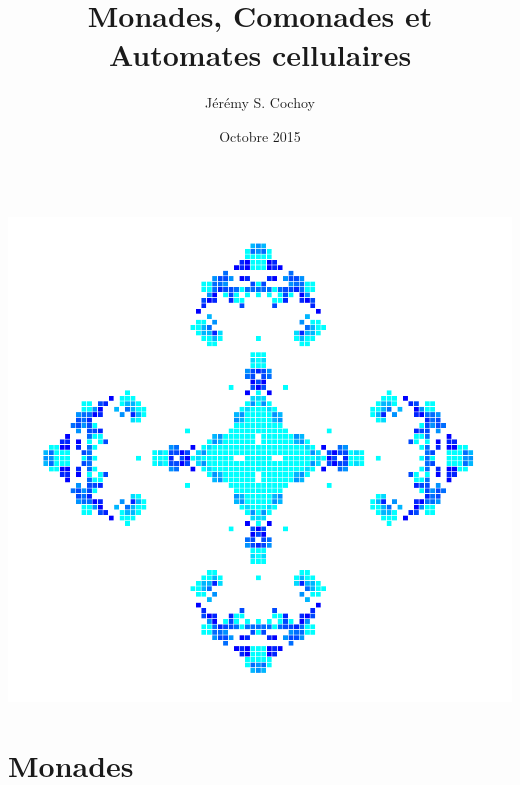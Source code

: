 \documentclass{beamer}
\begin{document}
\title{Monades, Comonades et Automates cellulaires}
\author{Jérémy S. Cochoy}
\date{Octobre 2015}


\begin{frame}
\titlepage
\end{frame}

\begin{frame}
  \begin{columns}[t]
  \begin{column}{5cm}
  \tableofcontents[sections={1-3}]
  \end{column}
  \begin{column}{5cm}
  \tableofcontents[sections={4-8}]
  \end{column}
  \end{columns}
\end{frame}

\begin{frame}

\begin{center}
\includegraphics[scale=0.3]{screen1.png}
\end{center}

\end{frame}

\section{Monades}
\end{document}
